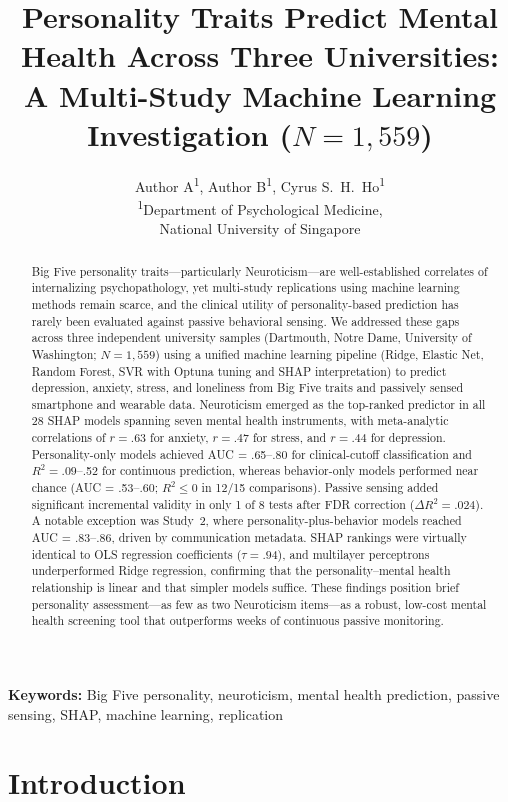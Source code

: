 \documentclass[12pt, a4paper]{article}
\title{Personality Traits Predict Mental Health Across Three Universities:\\
       A Multi-Study Machine Learning Investigation ($N = 1{,}559$)}
\author{
  Author A\textsuperscript{1},
  Author B\textsuperscript{1},
  Cyrus S.~H.~Ho\textsuperscript{1}
  \\[6pt]
  \textsuperscript{1}Department of Psychological Medicine,\\
  National University of Singapore
}
\date{}
\begin{document}
\maketitle

\begin{abstract}
Big Five personality traits---particularly Neuroticism---are well-established correlates of internalizing psychopathology, yet multi-study replications using machine learning methods remain scarce, and the clinical utility of personality-based prediction has rarely been evaluated against passive behavioral sensing. We addressed these gaps across three independent university samples (Dartmouth, Notre Dame, University of Washington; $N = 1{,}559$) using a unified machine learning pipeline (Ridge, Elastic Net, Random Forest, SVR with Optuna tuning and SHAP interpretation) to predict depression, anxiety, stress, and loneliness from Big Five traits and passively sensed smartphone and wearable data. Neuroticism emerged as the top-ranked predictor in all 28 SHAP models spanning seven mental health instruments, with meta-analytic correlations of $r = .63$ for anxiety, $r = .47$ for stress, and $r = .44$ for depression. Personality-only models achieved AUC = .65--.80 for clinical-cutoff classification and $R^2 = .09$--.52 for continuous prediction, whereas behavior-only models performed near chance (AUC = .53--.60; $R^2 \leq 0$ in 12/15 comparisons). Passive sensing added significant incremental validity in only 1 of 8 tests after FDR correction ($\Delta R^2 = .024$). A notable exception was Study~2, where personality-plus-behavior models reached AUC = .83--.86, driven by communication metadata. SHAP rankings were virtually identical to OLS regression coefficients ($\tau = .94$), and multilayer perceptrons underperformed Ridge regression, confirming that the personality--mental health relationship is linear and that simpler models suffice. These findings position brief personality assessment---as few as two Neuroticism items---as a robust, low-cost mental health screening tool that outperforms weeks of continuous passive monitoring.
\end{abstract}

\textbf{Keywords:} Big Five personality, neuroticism, mental health prediction, passive sensing, SHAP, machine learning, replication

\newpage

\section{Introduction}
\end{document}

